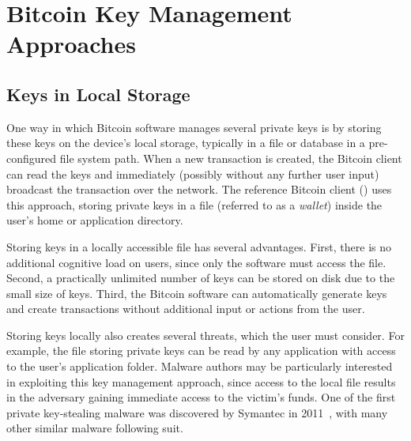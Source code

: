 
\section{Bitcoin Key Management Approaches} 
\label{sec:approaches}


\subsection{Keys in Local Storage}
\label{sec:localstorage}
One way in which Bitcoin software manages several private keys is by storing these keys on the device's local storage, typically in a file or database in a pre-configured file system path. When a new transaction is created, the Bitcoin client can read the keys and immediately (possibly without any further user input) broadcast the transaction over the network. The reference Bitcoin client (\bitcoinclient) uses this approach, storing private keys in a file (referred to as a \emph{wallet}) inside the user's home or application directory. 

Storing keys in a locally accessible file has several advantages. First, there is no additional cognitive load on users, since only the software must access the file. Second, a practically unlimited number of keys can be stored on disk due to the small size of keys. Third, the Bitcoin software can automatically generate keys and create transactions without additional input or actions from the user. 

Storing keys locally also creates several threats, which the user must consider. For example, the file storing private keys can be read by any application with access to the user's application folder. Malware authors may be particularly interested in exploiting this key management approach, since access to the local file results in the adversary gaining immediate access to the victim's funds. One of the first private key-stealing malware was discovered by Symantec in 2011~\cite{coinbit}, with many other similar malware following suit.


